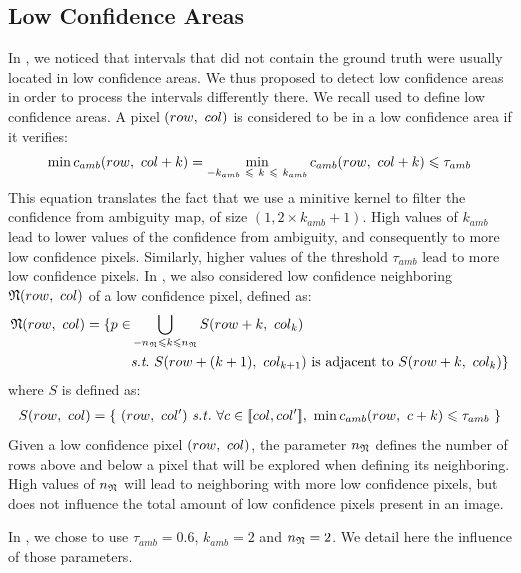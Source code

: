 \subsection{Low Confidence Areas}
In , we noticed that intervals that did not contain the ground truth were usually located in low confidence areas. We thus proposed to detect low confidence areas in order to process the intervals differently there. We recall  used to define low confidence areas. A pixel $(row, ~col)$ is considered to be in a low confidence area if it verifies:
\begin{align*}
    \min c_{amb}(row, ~col+k)=\min_{-k_{amb}~\leqslant~ k~\leqslant ~k_{amb}}c_{amb}(row, ~col+k)\leqslant \tau_{amb}
\end{align*}
This equation translates the fact that we use a minitive kernel to filter the confidence from ambiguity map, of size $(1, 2\times k_{amb}+1)$. High values of $k_{amb}$ lead to lower values of the confidence from ambiguity, and consequently to more low confidence pixels. Similarly, higher values of the threshold $\tau_{amb}$ lead to more low confidence pixels. In , we also considered low confidence neighboring $\mathfrak{N}(row, ~col)$ of a low confidence pixel, defined as:
\begin{align*}
    \N(row,~col) = \{ p\in &\bigcup_{-n_\N\leqslant k\leqslant n_\N}S(row+k, ~col_k)\\
    &\st~S(row + (k+1), ~col_{k+1})\text{ is adjacent to }S(row+k, ~col_{k})\}
\end{align*}
where $S$ is defined as:
\begin{align*}
    S(\rowcol) = \{~ (row,~col') \text{ \st }~\forall c\in\opi col, col'\cli,~\min c_{amb}(row, ~c+k)\leqslant \tau_{amb}~\}
\end{align*}
Given a low confidence pixel $(row, ~col)$, the parameter $n_{\mathfrak{N}}$ defines the number of rows above and below a pixel that will be explored when defining its neighboring. High values of $n_{\mathfrak{N}}$ will lead to neighboring with more low confidence pixels, but does not influence the total amount of low confidence pixels present in an image.

In , we chose to use $\tau_{amb}=0.6$, $k_{amb}=2$ and $n_{\mathfrak{N}}=2$. We detail here the influence of those parameters.

